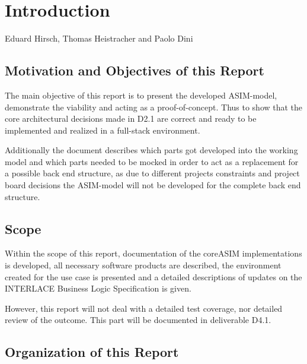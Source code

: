 \chapter{Introduction}
\label{ch:Introduction}

\vspace{-1cm}
\begin{center}
Eduard Hirsch, Thomas Heistracher and Paolo Dini
\end{center}


\section{Motivation and Objectives of this Report}

The main objective of this report is to present the developed ASIM-model, demonstrate the viability and acting as a proof-of-concept. Thus to show that the core architectural decisions made in D2.1 are correct and ready to be implemented and realized in a full-stack environment.

Additionally the document describes which parts got developed into the working model and which parts needed to be mocked in order to act as a replacement for a possible back end structure, as due to different projects constraints and project board decisions the ASIM-model will not be developed for the complete back end structure.

\section{Scope}

Within the scope of this report, documentation of the coreASIM implementations is developed, all necessary software products are described, the environment created for the use case is presented and a detailed descriptions of updates on the
INTERLACE Business Logic Specification is given. 

However, this report will not deal with a detailed test coverage, nor detailed review of the outcome. This part will be documented in deliverable D4.1.

\section{Organization of this Report}


\newpage
